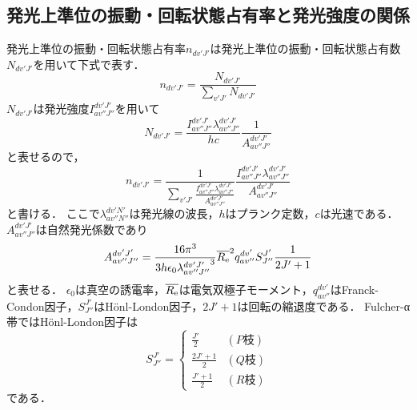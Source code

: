 \subsection{発光上準位の振動・回転状態占有率と発光強度の関係}
発光上準位の振動・回転状態占有率$n_{dv'J'}$は発光上準位の振動・回転状態占有数$N_{dv'J'}$を用いて下式で表す．
\begin{equation}
    n_{dv'J'} = \frac{N_{dv'J'}}{\sum_{v'J'} N_{dv'J'}}
\end{equation}
$N_{dv'J'}$は発光強度$I^{dv'J'}_{av''J''}$を用いて
\begin{equation}
    N_{dv'J'}=\frac{I^{dv'J'}_{av''J''}\lambda^{dv'J'}_{av''J''}}{hc}\frac{1}{A^{dv'J'}_{av''J''}}
\end{equation}
と表せるので，
\begin{equation}
    n_{dv'J'} = \frac{1}{\sum_{v'J'} \frac{I^{dv'J'}_{av''J''}\lambda^{dv'J'}_{av''J''}}{A^{dv'J'}_{av''J''}}} \frac{I^{dv'J'}_{av''J''}\lambda^{dv'J'}_{av''J''}}{A^{dv'J'}_{av''J''}}
\end{equation}
と書ける．
ここで$\lambda^{dv'N'}_{av''N''}$は発光線の波長，$h$はプランク定数，$c$は光速である．
$A^{dv'J'}_{av''J''}$は自然発光係数であり
\begin{equation}
    A^{dv'J'}_{av''J''} = \frac{16 \pi^3}{3h \epsilon_0 {\lambda^{dv'J'}_{av''J''}}^3 } \overline{R_{\rm e}}^2 q^{dv'}_{av''} S^{J'}_{J''} \frac{1}{2J'+1}
\end{equation}
と表せる\cite{PRnoijousei}．
$\epsilon_0$は真空の誘電率，$\overline{R_{\rm e}}$は電気双極子モーメント，$q^{dv'}_{av''}$はFranck-Condon因子\cite{franck-condon}，$S^{J'}_{J''}$はH\"{o}nl-London因子，$2J'+1$は回転の縮退度である．
Fulcher-α帯ではH\"{o}nl-London因子は
\begin{equation}
    S^{J'}_{J''} = \begin{cases}
        \frac{J'}{2} & (P枝)\\
        \frac{2J'+1}{2} & (Q枝)\\
        \frac{J'+1}{2} & (R枝)
    \end{cases}
\end{equation}
である\cite{PRnoijousei}．

